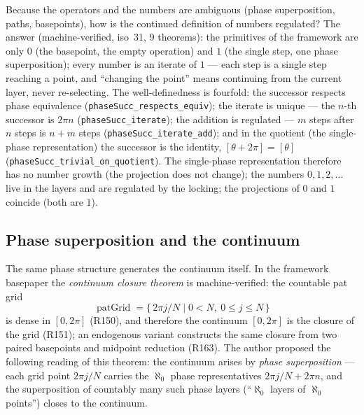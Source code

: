 \documentclass{article}
\begin{document}
Because the operators and the numbers are ambiguous (phase
superposition, paths, basepoints), how is the continued definition of
numbers regulated? The answer (machine-verified, iso~31, 9
theorems): the primitives of the framework are only $0$ (the
basepoint, the empty operation) and $1$ (the single step, one phase
superposition); every number is an iterate of $1$ --- each step is a
single step reaching a point, and ``changing the point'' means
continuing from the current layer, never re-selecting. The
well-definedness is fourfold: the successor respects phase equivalence
(\texttt{phaseSucc\_respects\_equiv}); the iterate is unique --- the
$n$-th successor is $2\pi n$ (\texttt{phaseSucc\_iterate}); the
addition is regulated --- $m$ steps after $n$ steps is $n+m$ steps
(\texttt{phaseSucc\_iterate\_add}); and in the quotient (the
single-phase representation) the successor is the identity,
$[\theta+2\pi]=[\theta]$ (\texttt{phaseSucc\_trivial\_on\_quotient}).
The single-phase representation therefore has no number growth (the
projection does not change); the numbers $0,1,2,\dots$ live in the
layers and are regulated by the locking; the projections of $0$ and $1$
coincide (both are $1$).

\subsection*{Phase superposition and the continuum}

The same phase structure generates the continuum itself. In the framework
basepaper \cite{patbase} the \emph{continuum closure theorem} is
machine-verified: the countable pat grid
\[
\operatorname{patGrid}=\{\,2\pi j/N \mid 0<N,\ 0\le j\le N\,\}
\]
is dense in $[0,2\pi]$ (R150), and therefore the continuum $[0,2\pi]$ is
the closure of the grid (R151); an endogenous variant constructs the same
closure from two paired basepoints and midpoint reduction (R163). The
author proposed the following reading of this theorem: the continuum
arises by \emph{phase superposition} --- each grid point $2\pi j/N$
carries the $\aleph_0$ phase representatives $2\pi j/N+2\pi n$, and the
superposition of countably many such phase layers (``$\aleph_0$ layers of
$\aleph_0$ points'') closes to the continuum.
\end{document}
